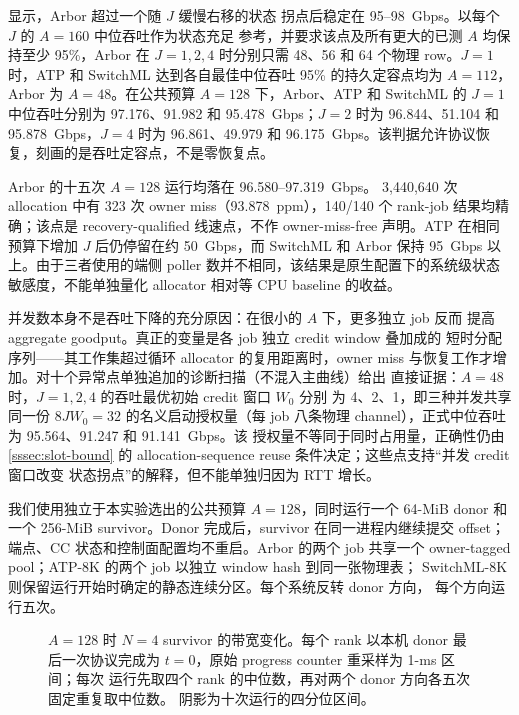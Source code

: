  显示，Arbor 超过一个随 $J$ 缓慢右移的状态
拐点后稳定在 95--98~Gbps。以每个 $J$ 的 $A=160$ 中位吞吐作为状态充足
参考，并要求该点及所有更大的已测 $A$ 均保持至少 95\%，Arbor 在
$J=1,2,4$ 时分别只需 48、56 和 64 个物理 row。$J=1$ 时，ATP 和
SwitchML 达到各自最佳中位吞吐 95\% 的持久定容点均为 $A=112$，Arbor
为 $A=48$。在公共预算 $A=128$ 下，Arbor、ATP 和 SwitchML 的 $J=1$
中位吞吐分别为 97.176、91.982 和 95.478~Gbps；$J=2$ 时为
96.844、51.104 和 95.878~Gbps，$J=4$ 时为 96.861、49.979 和
96.175~Gbps。该判据允许协议恢复，刻画的是吞吐定容点，不是零恢复点。

Arbor 的十五次 $A=128$ 运行均落在 96.580--97.319~Gbps。
3,440,640 次 allocation 中有 323 次 owner miss（93.878~ppm），140/140 个
rank-job 结果均精确；该点是 recovery-qualified 线速点，不作
owner-miss-free 声明。ATP 在相同预算下增加 $J$ 后仍停留在约
50~Gbps，而 SwitchML 和 Arbor 保持 95~Gbps 以上。由于三者使用的端侧
poller 数并不相同，该结果是原生配置下的系统级状态敏感度，不能单独量化
allocator 相对等 CPU baseline 的收益。

并发数本身不是吞吐下降的充分原因：在很小的 $A$ 下，更多独立 job 反而
提高 aggregate goodput。真正的变量是各 job 独立 credit window 叠加成的
短时分配序列——其工作集超过循环 allocator 的复用距离时，owner miss
与恢复工作才增加。对十个异常点单独追加的诊断扫描（不混入主曲线）给出
直接证据：$A=48$ 时，$J=1,2,4$ 的吞吐最优初始 credit 窗口 $W_0$ 分别
为 4、2、1，即三种并发共享同一份 $8JW_0=32$ 的名义启动授权量（每 job
八条物理 channel），正式中位吞吐为 95.564、91.247 和 91.141~Gbps。该
授权量不等同于同时占用量，正确性仍由 \cref{sssec:slot-bound} 的
allocation-sequence reuse 条件决定；这些点支持``并发 credit 窗口改变
状态拐点''的解释，但不能单独归因为 RTT 增长。

我们使用独立于本实验选出的公共预算 $A=128$，同时运行一个 64-MiB donor
和一个 256-MiB survivor。Donor 完成后，survivor 在同一进程内继续提交
offset；端点、CC 状态和控制面配置均不重启。Arbor 的两个 job 共享一个
owner-tagged pool；ATP-8K 的两个 job 以独立 window hash 到同一张物理表；
SwitchML-8K 则保留运行开始时确定的静态连续分区。每个系统反转 donor 方向，
每个方向运行五次。

\begin{figure}[t]
\centering

\caption{$A=128$ 时 $N=4$ survivor 的带宽变化。每个 rank 以本机 donor
最后一次协议完成为 $t=0$，原始 progress counter 重采样为 1-ms 区间；每次
运行先取四个 rank 的中位数，再对两个 donor 方向各五次固定重复取中位数。
阴影为十次运行的四分位区间。}
\label{fig:physical-state-handoff}
\end{figure}

